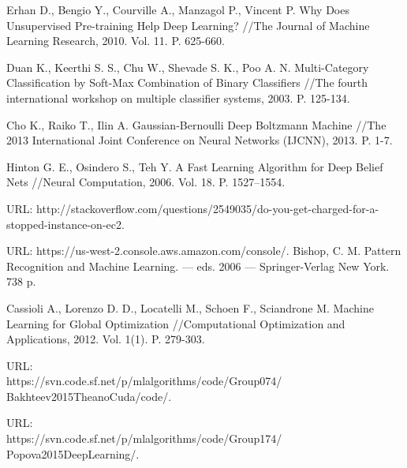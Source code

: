 \documentclass[12pt,notitlepage]{article}
\begin{document}
\begin{thebibliography}{10}
{Erhan D., 
Bengio Y.,
Courville A.,
Manzagol P.,
Vincent P.}
Why Does Unsupervised Pre-training Help Deep Learning? //{The Journal of Machine Learning Research}, 2010. Vol. 11. P. 625-660.


{ Duan K., Keerthi S. S., Chu W.,  Shevade S. K., Poo A. N.}
Multi-Category Classification by Soft-Max
Combination of Binary Classifiers //{The
fourth international workshop on multiple classifier systems}, 2003. P. 125-134.


{Cho K.,  Raiko T.,  Ilin A.}
Gaussian-Bernoulli Deep Boltzmann Machine //{The 2013 International Joint Conference on Neural Networks (IJCNN)}, 2013. P. 1-7. 

{Hinton G. E.,  Osindero S., Teh Y.}
A Fast Learning Algorithm for Deep Belief Nets //{Neural Computation}, 2006. Vol. 18. P. 1527–1554.

URL: http://stackoverflow.com/questions/2549035/do-you-get-charged-for-a-stopped-instance-on-ec2.

%
URL: https://us-west-2.console.aws.amazon.com/console/.
%
{Bishop, C. M.}
Pattern Recognition and Machine Learning. --- eds. 2006 --- Springer-Verlag New York. 738 p.


{Cassioli A., Lorenzo D. D., Locatelli M., Schoen F., Sciandrone M.}
Machine Learning for Global Optimization //{Computational Optimization and Applications}, 2012. Vol. 1(1). P. 279-303.

%
URL: \\ https://svn.code.sf.net/p/mlalgorithms/code/Group074/\\Bakhteev2015TheanoCuda/code/.

%
URL: \\https://svn.code.sf.net/p/mlalgorithms/code/Group174/\\Popova2015DeepLearning/.
\end{thebibliography}
\end{document}
